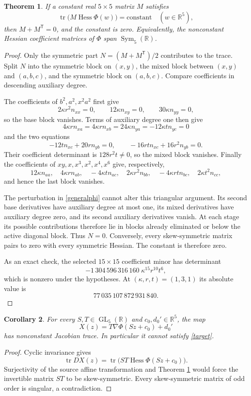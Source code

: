\documentclass[11pt,a4paper]{article}
\newtheorem{theorem}{Theorem}[section]\newtheorem{proposition}[theorem]{Proposition}\newtheorem{corollary}[theorem]{Corollary}
\theoremstyle{remark}\newtheorem{remark}[theorem]{Remark}
\newcommand{\R}{\mathbb R}\newcommand{\Q}{\mathbb Q}\newcommand{\Id}{\operatorname{Id}}\newcommand{\tr}{\operatorname{tr}}\newcommand{\Hess}{\operatorname{Hess}}
\begin{document}
\begin{theorem}\label{hessiantheorem}
If a constant real $5\times5$ matrix $M$ satisfies
\[
\tr\bigl(M\Hess\Phi(w)\bigr)=\text{constant}\quad(w\in\R^5),
\]
then $M+M^{\mathsf T}=0$, and the constant is zero. Equivalently, the
nonconstant Hessian coefficient matrices of $\Phi$ span
$\operatorname{Sym}_5(\R)$.
\end{theorem}
\begin{proof}
Only the symmetric part $N=(M+M^{\mathsf T})/2$ contributes to the trace.
Split $N$ into the symmetric block on $(x,y)$, the mixed block between
$(x,y)$ and $(a,b,c)$, and the symmetric block on $(a,b,c)$. Compare
coefficients in descending auxiliary degree.

The coefficients of $b^2,a^2,x^2a^2$ first give
\[
2\kappa r^2 n_{xx}=0,\qquad
12\kappa n_{xy}=0,\qquad
30\kappa n_{yy}=0,
\]
so the base block vanishes.  Terms of auxiliary degree one then give
\[
4\kappa r n_{xa}=4\kappa r n_{xb}=24\kappa n_{ya}
=-12\kappa t n_{yc}=0
\]
and the two equations
\[
-12t n_{xc}+20r n_{yb}=0,\qquad
-16rt n_{xc}+16r^2 n_{yb}=0.
\]
Their coefficient determinant is $128r^2t\ne0$, so the mixed block vanishes.
Finally the coefficients of $xy,x,x^3,x^2,x^4,x^6$ give, respectively,
\[
12\kappa n_{aa},\quad4\kappa r n_{ab},\quad-4\kappa t n_{ac},\quad
2\kappa r^2 n_{bb},\quad-4\kappa rt n_{bc},\quad2\kappa t^2 n_{cc},
\]
and hence the last block vanishes.

The perturbation in \eqref{generalphi} cannot alter this triangular argument.
Its second base derivatives have auxiliary degree at most one, its mixed
derivatives have auxiliary degree zero, and its second auxiliary derivatives
vanish.  At each stage its possible contributions therefore lie in blocks
already eliminated or below the active diagonal block. Thus $N=0$.
Conversely, every skew-symmetric matrix pairs to zero with every symmetric
Hessian. The constant is therefore zero.

As an exact check, the selected $15\times15$ coefficient minor has determinant
\begin{equation}\label{hessdet}
-1\,304\,596\,316\,160\;\kappa^{15}r^{10}t^6,
\end{equation}
which is nonzero under the hypotheses.  At $(\kappa,r,t)=(1,3,1)$ its absolute
value is
\[
77\,035\,107\,872\,931\,840.
\]
\end{proof}

\begin{corollary}\label{affine}
For every $S,T\in\operatorname{GL}_5(\R)$ and $c_0,d_0'\in\R^5$, the map
\[
X(z)=T\nabla\Phi(Sz+c_0)+d_0'
\]
has nonconstant Jacobian trace. In particular it cannot satisfy \eqref{target}.
\end{corollary}
\begin{proof}
Cyclic invariance gives
\[
\tr DX(z)=\tr\bigl(ST\Hess\Phi(Sz+c_0)\bigr).
\]
Surjectivity of the source affine transformation and Theorem
\ref{hessiantheorem} would force the invertible matrix $ST$ to be
skew-symmetric. Every skew-symmetric matrix of odd order is singular, a
contradiction.
\end{proof}
\end{document}
